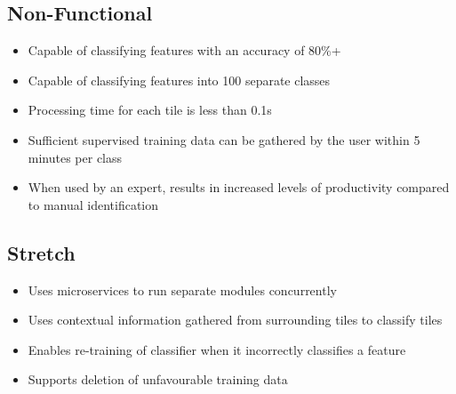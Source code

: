 \subsection{Non-Functional}
\begin{itemize}
    \item Capable of classifying features with an accuracy of 80\%+
    \item Capable of classifying features into 100 separate classes
    \item Processing time for each tile is less than 0.1s
    \item Sufficient supervised training data can be gathered by the user within 5 minutes per class
    \item When used by an expert, results in increased levels of productivity compared to manual identification
\end{itemize}
\subsection{Stretch}
\begin{itemize}
    \item Uses microservices to run separate modules concurrently
    \item Uses contextual information gathered from surrounding tiles to classify tiles
    \item Enables re-training of classifier when it incorrectly classifies a feature
    \item Supports deletion of unfavourable training data
\end{itemize}



